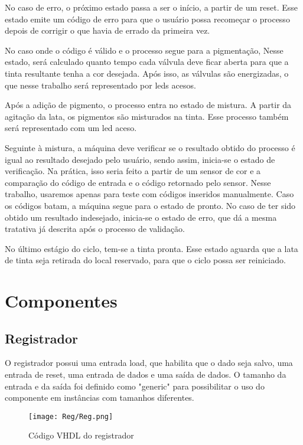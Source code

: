 \documentclass[12pt,a4paper,oneside]{abntex2}
\begin{document}
            No caso de erro, o próximo estado passa a ser o início, a partir de um reset. Esse estado emite um código de erro para que o usuário possa recomeçar o processo depois de corrigir o que havia de errado da primeira vez.\par
            No caso onde o código é válido e o processo segue para a pigmentação, Nesse estado, será calculado quanto tempo cada válvula deve ficar aberta para que a tinta resultante tenha a cor desejada. Após isso, as válvulas são energizadas, o que nesse trabalho será representado por leds acesos.\par
            Após a adição de pigmento, o processo entra no estado de mistura. A partir da agitação da lata, os pigmentos são misturados na tinta. Esse processo também será representado com um led aceso.\par
            Seguinte à mistura, a máquina deve verificar se o resultado obtido do processo é igual ao resultado desejado pelo usuário, sendo assim, inicia-se o estado de verificação. Na prática, isso seria feito a partir de um sensor de cor e a comparação do código de entrada e o código retornado pelo sensor. Nesse trabalho, usaremos apenas para teste com códigos inseridos manualmente. Caso os códigos batam, a máquina segue para o estado de pronto. No caso de ter sido obtido um resultado indesejado, inicia-se o estado de erro, que dá a mesma tratativa já descrita após o processo de validação.\par
            No último estágio do ciclo, tem-se a tinta pronta. Esse estado aguarda que a lata de tinta seja retirada do local reservado, para que o ciclo possa ser reiniciado.\par
            
        \section{Componentes}
            \subsection{Registrador}
                O registrador possui uma entrada load, que habilita que o dado seja salvo, uma entrada de reset, uma entrada de dados e uma saída de dados. O tamanho da entrada e da saída foi definido como "generic" para possibilitar o uso do componente em instâncias com tamanhos diferentes.

                \begin{figure}[h!]
                    \centering
                    \texttt{[image: Reg/Reg.png]}
                    \caption{Código VHDL do registrador}
                    \label{fig:Reg}
                \end{figure}
\end{document}
